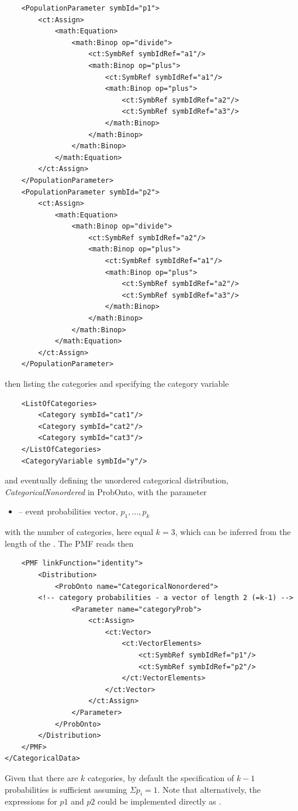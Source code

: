{\begin{lstlisting}
    <PopulationParameter symbId="p1">
        <ct:Assign>
            <math:Equation>
                <math:Binop op="divide">
                    <ct:SymbRef symbIdRef="a1"/>
                    <math:Binop op="plus">
                        <ct:SymbRef symbIdRef="a1"/>
                        <math:Binop op="plus">
                            <ct:SymbRef symbIdRef="a2"/>
                            <ct:SymbRef symbIdRef="a3"/>
                        </math:Binop>
                    </math:Binop>
                </math:Binop>
            </math:Equation>
        </ct:Assign>
    </PopulationParameter>
    <PopulationParameter symbId="p2">
        <ct:Assign>
            <math:Equation>
                <math:Binop op="divide">
                    <ct:SymbRef symbIdRef="a2"/>
                    <math:Binop op="plus">
                        <ct:SymbRef symbIdRef="a1"/>
                        <math:Binop op="plus">
                            <ct:SymbRef symbIdRef="a2"/>
                            <ct:SymbRef symbIdRef="a3"/>
                        </math:Binop>
                    </math:Binop>
                </math:Binop>
            </math:Equation>
        </ct:Assign>
    </PopulationParameter>
\end{lstlisting}
then listing the categories and specifying the category variable
\lstset{language=XML}
\begin{lstlisting}
    <ListOfCategories> 
        <Category symbId="cat1"/>
        <Category symbId="cat2"/>
        <Category symbId="cat3"/>
    </ListOfCategories>                    
    <CategoryVariable symbId="y"/>
\end{lstlisting}
and eventually defining the unordered categorical distribution, \emph{CategoricalNonordered} 
in ProbOnto, with the parameter
\begin{itemize}
\item 
{}  -- event probabilities vector, $p_1, \ldots, p_k$
\end{itemize}
with the number of categories, here equal $k\!=\!3$, which can be inferred from the length of the 
. The PMF reads then

\lstset{language=XML}
\begin{lstlisting}
    <PMF linkFunction="identity">
        <Distribution>
            <ProbOnto name="CategoricalNonordered">
		<!-- category probabilities - a vector of length 2 (=k-1) -->
                <Parameter name="categoryProb">
                    <ct:Assign>
                        <ct:Vector>
                            <ct:VectorElements>
                                <ct:SymbRef symbIdRef="p1"/>
                                <ct:SymbRef symbIdRef="p2"/>
                            </ct:VectorElements>
                        </ct:Vector>
                    </ct:Assign>
                </Parameter>
            </ProbOnto>
        </Distribution>
    </PMF>
</CategoricalData>
\end{lstlisting}
Given that there are $k$ categories, by default the specification of $k-1$ probabilities 
is sufficient assuming $\Sigma p_i = 1$. Note that alternatively, the expressions for 
$p1$ and $p2$ could be implemented directly as .

}
